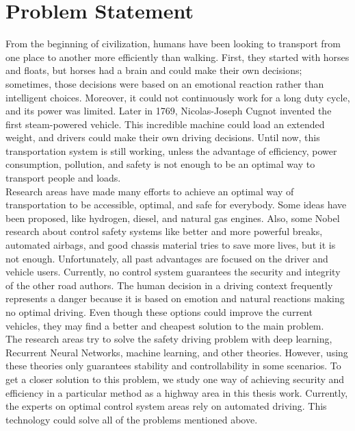 \chapter{Problem Statement}

From the beginning of civilization, humans have been looking to transport from one place to another more efficiently than walking. First, they started with horses and floats, but horses had a brain and could make their own decisions; sometimes, those decisions were based on an emotional reaction rather than intelligent choices. Moreover, it could not continuously work for a long duty cycle, and its power was limited. Later in 1769, Nicolas-Joseph Cugnot invented the first steam-powered vehicle. This incredible machine could load an extended weight, and drivers could make their own driving decisions. Until now, this transportation system is still working, unless the advantage of efficiency, power consumption, pollution, and safety is not enough to be an optimal way to transport people and loads.\\

Research areas have made many efforts to achieve an optimal way of transportation to be accessible, optimal, and safe for everybody. Some ideas have been proposed, like hydrogen, diesel, and natural gas engines. Also, some Nobel research about control safety systems like better and more powerful breaks, automated airbags, and good chassis material tries to save more lives, but it is not enough. Unfortunately, all past advantages are focused on the driver and vehicle users. Currently, no control system guarantees the security and integrity of the other road authors. The human decision in a driving context frequently represents a danger because it is based on emotion and natural reactions making no optimal driving. Even though these options could improve the current vehicles, they may find a better and cheapest solution to the main problem.\\

The research areas try to solve the safety driving problem with deep learning, Recurrent Neural Networks, machine learning, and other theories. However, using these theories only guarantees stability and controllability in some scenarios. To get a closer solution to this problem, we study one way of achieving security and efficiency in a particular method as a highway area in this thesis work. Currently, the experts on optimal control system areas rely on automated driving. This technology could solve all of the problems mentioned above.\\

